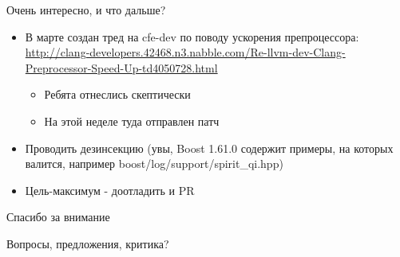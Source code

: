 \documentclass{beamer}
\begin{document}
\begin{frame}[t, fragile]{Очень интересно, и что дальше?}
\begin{itemize}[<+->]
\item В марте создан тред на cfe-dev по поводу ускорения препроцессора:
\url {http://clang-developers.42468.n3.nabble.com/Re-llvm-dev-Clang-Preprocessor-Speed-Up-td4050728.html}
\begin{itemize}
\item Ребята отнеслись скептически
\item На этой неделе туда отправлен патч
\end{itemize} 
\item Проводить дезинсекцию (увы, Boost 1.61.0 содержит примеры, на которых валится, например boost/log/support/spirit\_qi.hpp)
\item Цель-максимум - доотладить и PR
\end{itemize} 

\end{frame}

\begin{frame}[fragile]{Спасибо за внимание}

\begin{center}
\Huge Вопросы, предложения, критика?
\end{center}
\end{frame}
\end{document}
